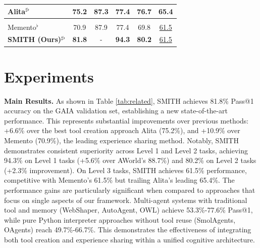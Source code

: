 \documentclass{article} %
\begin{document}
\begin{table}[!thb]
\begin{tabular}{lccccc}
    \midrule
    Alita$^{\sharp\flat}$ \citep{qiu2025alita}
    & 75.2 & 87.3 & 77.4 & 76.7 & \textbf{65.4} \\
    \midrule
    \multicolumn{6}{c}{\cellcolor[RGB]{248, 206, 204}{w. \emph{Experience Sharing}}} \\
    \midrule
    Memento$^{\flat}$ \citep{zhou2025memento}
    & 70.9 & 87.9 & 77.4 & 69.8 & \underline{61.5} \\
    \midrule
    \textbf{SMITH (Ours)}$^{\sharp\flat}$ 
    & \textbf{81.8} & - & \textbf{94.3} & \textbf{80.2} & \underline{61.5} \\
    \midrule
    \bottomrule
    \end{tabular}
\end{table}

\section{Experiments}
\label{experiments}

\textbf{Main Results.} As shown in Table \ref{tab:related}, SMITH achieves 81.8\% Pass@1 accuracy on the GAIA validation set, establishing a new state-of-the-art performance. This represents substantial improvements over previous methods: +6.6\% over the best tool creation approach Alita (75.2\%), and +10.9\% over Memento (70.9\%), the leading experience sharing method. Notably, SMITH demonstrates consistent superiority across Level 1 and Level 2 tasks, achieving 94.3\% on Level 1 tasks (+5.6\% over AWorld's 88.7\%) and 80.2\% on Level 2 tasks (+2.3\% improvement). On Level 3 tasks, SMITH achieves 61.5\% performance, competitive with Memento's 61.5\% but trailing Alita's leading 65.4\%. The performance gains are particularly significant when compared to approaches that focus on single aspects of our framework. Multi-agent systems with traditional tool and memory (WebShaper, AutoAgent, OWL) achieve 53.3\%-77.6\% Pass@1, while pure Python interpreter approaches without tool reuse (SmolAgents, OAgents) reach 49.7\%-66.7\%. This demonstrates the effectiveness of integrating both tool creation and experience sharing within a unified cognitive architecture.
\end{document}
